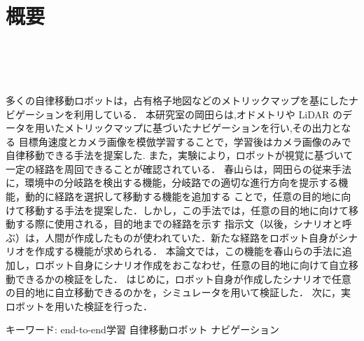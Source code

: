 \chapter*{概要}
\thispagestyle{empty}
%
\begin{center}
  \scalebox{1.0}{視覚と行動のend-to-end学習により}\\
    \vspace{-1.0zh}
    \scalebox{1.0}{経路追従行動をオンラインで模倣する手法の提案}\\
    \scalebox{1.0}{-目的地を示してトボロジカルマップからシナリオを生成-}\\
\end{center}

多くの自律移動ロボットは，占有格子地図などのメトリックマップを基にしたナビゲーションを利用している．
本研究室の岡田らは,オドメトリや LiDAR のデータを用いたメトリックマップに基づいたナビゲーションを行い,その出力となる
目標角速度とカメラ画像を模倣学習することで，学習後はカメラ画像のみで自律移動できる手法を提案した.
また，実験により，ロボットが視覚に基づいて一定の経路を周回できることが確認されている．
春山らは，岡田らの従来手法に，環境中の分岐路を検出する機能，分岐路での適切な進行方向を提示する機能，動的に経路を選択して移動する機能を追加する
ことで，任意の目的地に向けて移動する手法を提案した．しかし，この手法では，任意の目的地に向けて移動する際に使用される，目的地までの経路を示す
指示文（以後，シナリオと呼ぶ）は，人間が作成したものが使われていた．新たな経路をロボット自身がシナリオを作成する機能が求められる．
本論文では，この機能を春山らの手法に追加し，ロボット自身にシナリオ作成をおこなわせ，任意の目的地に向けて自立移動できるかの検証をした．
はじめに，ロボット自身が作成したシナリオで任意の目的地に自立移動できるのかを，シミュレータを用いて検証した．
次に，実ロボットを用いた検証を行った．




\vspace{1zh}
キーワード: end-to-end学習 自律移動ロボット ナビゲーション
\newpage
